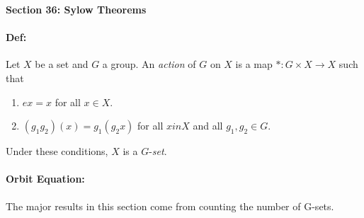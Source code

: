 \documentclass[10pt,a4paper]{article}
\begin{document}
\begin{center}
\textbf{Section 36: Sylow Theorems}
\end{center}

\paragraph{Def:} Let $X$ be a set and $G$ a group. An \textit{action} of $G$ on $X$ is a map $*: G \times X \to X$ such that
\begin{enumerate}
\item $ex = x$ for all $x \in X$.
\item $(g_1g_2)(x) = g_1(g_2x)$ for all $x in X$ and all $g_1, g_2 \in G$.
\end{enumerate}
Under these conditions, $X$ is a $G$-\textit{set}.

\paragraph{Orbit Equation:} The major results in this section come from counting the number of  G-sets.
\end{document}
